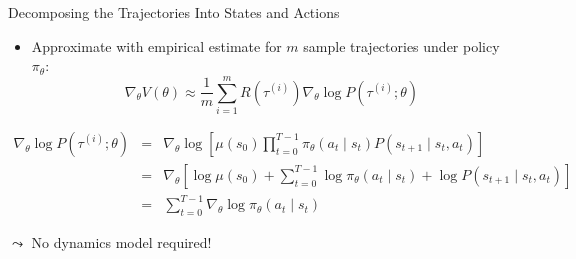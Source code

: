 \begin{frame}[c]{Decomposing the Trajectories Into States and Actions}
	
	\begin{itemize}
		\item Approximate with empirical estimate for $m$ sample trajectories under
		policy $\pi_\theta$:
		$$\nabla_\theta V(\theta) \approx \frac{1}{m} \sum_{i=1}^{m} R(\tau^{(i)}) \nabla_\theta \log P(\tau^{(i)}; \theta) $$
	\end{itemize}

\footnotesize
\begin{eqnarray*}
\nabla_\theta \log P(\tau^{(i)}; \theta) &=& \nabla_\theta \log \left[ \mu(s_0) \prod_{t=0}^{T-1} \pi_\theta(a_t \mid s_t) P(s_{t+1} \mid s_t, a_t) \right]\\
&=& \nabla_\theta \left[ \log \mu(s_0) + \sum_{t=0}^{T-1} \log \pi_\theta(a_t \mid s_t) + \log P(s_{t+1}\mid s_t, a_t) \right]\\
&=& \sum_{t=0}^{T-1} \nabla_\theta \log \pi_\theta (a_t \mid s_t)
\end{eqnarray*}
	
$\leadsto$ No dynamics model required!
	
\end{frame}

